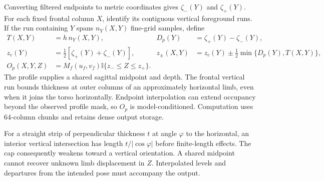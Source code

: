 \documentclass[11pt,a4paper]{article}
\newcommand{\indic}{\mathbb I}
\begin{document}
Converting filtered endpoints to metric coordinates gives $\zeta_-(Y)$ and $\zeta_+(Y)$. For each fixed frontal column $X$, identify its contiguous vertical foreground runs. If the run containing $Y$ spans $n_Y(X,Y)$ fine-grid samples, define
\begin{equation}
 \begin{aligned}
 T(X,Y)&=h\,n_Y(X,Y),&
 D_p(Y)&=\zeta_+(Y)-\zeta_-(Y),\\
 z_c(Y)&=\tfrac12[\zeta_+(Y)+\zeta_-(Y)],&
 z_\pm(X,Y)&=z_c(Y)\pm\tfrac12\min\{D_p(Y),T(X,Y)\},\\
 O_p(X,Y,Z)&=M_f(u_f,v_f)\indic\{z_-\leq Z\leq z_+\}.&&
 \end{aligned}
 \label{eq:profile}
\end{equation}
The profile supplies a shared sagittal midpoint and depth. The frontal vertical run bounds thickness at outer columns of an approximately horizontal limb, even when it joins the torso horizontally. Endpoint interpolation can extend occupancy beyond the observed profile mask, so $O_p$ is model-conditioned. Computation uses 64-column chunks and retains dense output storage.

For a straight strip of perpendicular thickness $t$ at angle $\varphi$ to the horizontal, an interior vertical intersection has length $t/|\cos\varphi|$ before finite-length effects. The cap consequently weakens toward a vertical orientation. A shared midpoint cannot recover unknown limb displacement in $Z$. Interpolated levels and departures from the intended pose must accompany the output.
\end{document}
